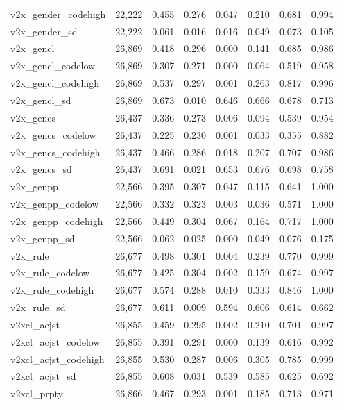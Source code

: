 \begin{table}[!htbp]
\begin{tabular}{@{\extracolsep{5pt}}lccccccc}
v2x\_gender\_codehigh & 22,222 & 0.455 & 0.276 & 0.047 & 0.210 & 0.681 & 0.994 \\ 
v2x\_gender\_sd & 22,222 & 0.061 & 0.016 & 0.016 & 0.049 & 0.073 & 0.105 \\ 
v2x\_gencl & 26,869 & 0.418 & 0.296 & 0.000 & 0.141 & 0.685 & 0.986 \\ 
v2x\_gencl\_codelow & 26,869 & 0.307 & 0.271 & 0.000 & 0.064 & 0.519 & 0.958 \\ 
v2x\_gencl\_codehigh & 26,869 & 0.537 & 0.297 & 0.001 & 0.263 & 0.817 & 0.996 \\ 
v2x\_gencl\_sd & 26,869 & 0.673 & 0.010 & 0.646 & 0.666 & 0.678 & 0.713 \\ 
v2x\_gencs & 26,437 & 0.336 & 0.273 & 0.006 & 0.094 & 0.539 & 0.954 \\ 
v2x\_gencs\_codelow & 26,437 & 0.225 & 0.230 & 0.001 & 0.033 & 0.355 & 0.882 \\ 
v2x\_gencs\_codehigh & 26,437 & 0.466 & 0.286 & 0.018 & 0.207 & 0.707 & 0.986 \\ 
v2x\_gencs\_sd & 26,437 & 0.691 & 0.021 & 0.653 & 0.676 & 0.698 & 0.758 \\ 
v2x\_genpp & 22,566 & 0.395 & 0.307 & 0.047 & 0.115 & 0.641 & 1.000 \\ 
v2x\_genpp\_codelow & 22,566 & 0.332 & 0.323 & 0.003 & 0.036 & 0.571 & 1.000 \\ 
v2x\_genpp\_codehigh & 22,566 & 0.449 & 0.304 & 0.067 & 0.164 & 0.717 & 1.000 \\ 
v2x\_genpp\_sd & 22,566 & 0.062 & 0.025 & 0.000 & 0.049 & 0.076 & 0.175 \\ 
v2x\_rule & 26,677 & 0.498 & 0.301 & 0.004 & 0.239 & 0.770 & 0.999 \\ 
v2x\_rule\_codelow & 26,677 & 0.425 & 0.304 & 0.002 & 0.159 & 0.674 & 0.997 \\ 
v2x\_rule\_codehigh & 26,677 & 0.574 & 0.288 & 0.010 & 0.333 & 0.846 & 1.000 \\ 
v2x\_rule\_sd & 26,677 & 0.611 & 0.009 & 0.594 & 0.606 & 0.614 & 0.662 \\ 
v2xcl\_acjst & 26,855 & 0.459 & 0.295 & 0.002 & 0.210 & 0.701 & 0.997 \\ 
v2xcl\_acjst\_codelow & 26,855 & 0.391 & 0.291 & 0.000 & 0.139 & 0.616 & 0.992 \\ 
v2xcl\_acjst\_codehigh & 26,855 & 0.530 & 0.287 & 0.006 & 0.305 & 0.785 & 0.999 \\ 
v2xcl\_acjst\_sd & 26,855 & 0.608 & 0.031 & 0.539 & 0.585 & 0.625 & 0.692 \\ 
v2xcl\_prpty & 26,866 & 0.467 & 0.293 & 0.001 & 0.185 & 0.713 & 0.971 \\ 

\end{tabular}
\end{table}
